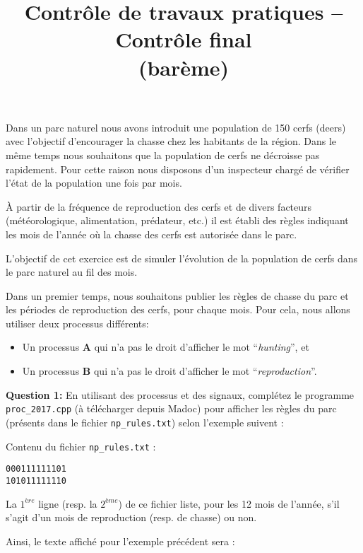 \documentclass[CC,sansRappel,12pt]{tdtp-utf8}
\date{}
\title{Contrôle de travaux pratiques -- Contrôle final \\ (barème)}
\newcommand{\bare}[1]{\textcolor{blue}{#1}}
\newcommand{\puntos}[1]{\textcolor{red}{\bf [#1 puntos]}}
\begin{document}
\begin{feuille}

Dans un parc naturel nous avons introduit une population de 150 cerfs (deers) avec l'objectif d'encourager la chasse chez les habitants de la région. Dans le même temps nous souhaitons que la population de cerfs ne décroisse pas rapidement. Pour cette raison nous disposons d'un inspecteur chargé de vérifier l'état de la population une fois par mois.

À partir de la fréquence de reproduction des cerfs et de divers facteurs (météorologique, alimentation, prédateur, etc.) il est établi des règles indiquant les mois de l'année où la chasse des cerfs est autorisée dans le parc.

L'objectif de cet exercice est de simuler l'évolution de la population de cerfs dans le parc naturel au fil des mois.

\begin{exercice}[Les processus \bare{\puntos{13}}]

Dans un premier temps, nous souhaitons publier les règles de chasse du parc et les périodes de reproduction des cerfs, pour chaque mois. Pour cela, nous allons utiliser deux processus différents:

\begin{itemize}
\item Un processus \textbf{A} qui n'a pas le droit d'afficher le mot ``\textit{hunting}'', et
\item Un processus \textbf{B} qui n'a pas le droit d'afficher le mot ``\textit{reproduction}''.
\end{itemize}

\textbf{Question 1:} En utilisant des processus et des signaux, complétez le programme \texttt{proc\_2017.cpp} (à télécharger depuis {\sc Madoc}) pour afficher les règles du parc (présents dans le fichier \texttt{np\_rules.txt}) selon l'exemple suivent :
\vspace{10pt}

Contenu du fichier \texttt{np\_rules.txt} :
\begin{Verbatim}
000111111101 
101011111110 
\end{Verbatim}

La $1^{ère}$ ligne (resp. la $2^{ème}$) de ce fichier liste, pour les 12 mois de l'année, s'il s'agit d'un mois de reproduction (resp. de chasse) ou non.

Ainsi, le texte affiché pour l'exemple précédent sera : \newpage


\end{exercice}
\end{feuille}
\end{document}
